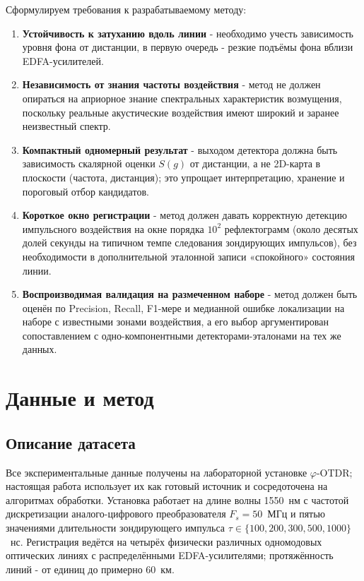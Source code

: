 \documentclass[12pt,a4paper]{extarticle}
\newcommand{\phiOTDR}{$\varphi$-OTDR}
\begin{document}
Сформулируем требования к разрабатываемому методу:
\begin{enumerate}[leftmargin=2.5em, label=\arabic*.]
  \item \textbf{Устойчивость к затуханию вдоль линии} - необходимо учесть зависимость уровня фона от дистанции, в первую очередь - резкие подъёмы фона вблизи EDFA-усилителей.
  \item \textbf{Независимость от знания частоты воздействия} - метод не должен опираться на априорное знание спектральных характеристик возмущения, поскольку реальные акустические воздействия имеют широкий и заранее неизвестный спектр.
  \item \textbf{Компактный одномерный результат} - выходом детектора должна быть зависимость скалярной оценки $S(g)$ от дистанции, а не 2D-карта в плоскости (частота, дистанция); это упрощает интерпретацию, хранение и пороговый отбор кандидатов.
  \item \textbf{Короткое окно регистрации} - метод должен давать корректную детекцию импульсного воздействия на окне порядка $10^2$ рефлектограмм (около десятых долей секунды на типичном темпе следования зондирующих импульсов), без необходимости в дополнительной эталонной записи «спокойного» состояния линии.
  \item \textbf{Воспроизводимая валидация на размеченном наборе} - метод должен быть оценён по Precision, Recall, F1-мере и медианной ошибке локализации на наборе с известными зонами воздействия, а его выбор аргументирован сопоставлением с одно-компонентными детекторами-эталонами на тех же данных.
\end{enumerate}

\newpage

\section{Данные и метод}

\subsection{Описание датасета}
\label{sec:dataset}

Все экспериментальные данные получены на лабораторной установке \phiOTDR; настоящая работа использует их как готовый источник и сосредоточена на алгоритмах обработки. Установка работает на длине волны 1550~нм с частотой дискретизации аналого-цифрового преобразователя $F_s = 50$~МГц и пятью значениями длительности зондирующего импульса $\tau \in \{100, 200, 300, 500, 1000\}$~нс. Регистрация ведётся на четырёх физически различных одномодовых оптических линиях с распределёнными EDFA-усилителями; протяжённость линий - от единиц до примерно 60~км.
\end{document}
